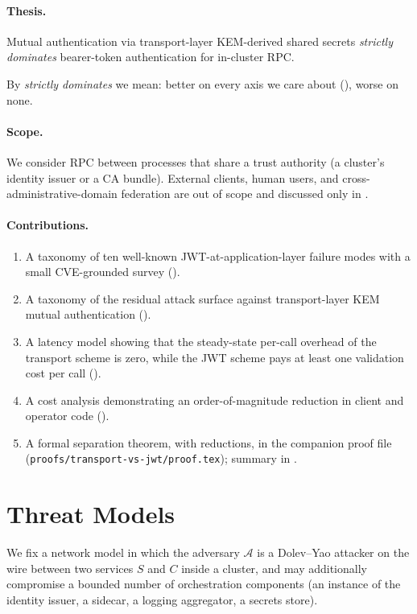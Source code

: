 \documentclass[11pt,a4paper]{article}
\theoremstyle{plain}
\theoremstyle{definition}
\begin{document}
\paragraph{Thesis.}
Mutual authentication via transport-layer KEM-derived shared secrets
\emph{strictly dominates} bearer-token authentication for in-cluster RPC.

By \emph{strictly dominates} we mean: better on every axis we care about
(), worse on none.

\paragraph{Scope.} We consider RPC between processes that share a trust
authority (a cluster's identity issuer or a CA bundle). External clients,
human users, and cross-administrative-domain federation are out of scope and
discussed only in .

\paragraph{Contributions.}
\begin{enumerate}[itemsep=2pt,topsep=2pt]
  \item A taxonomy of ten well-known JWT-at-application-layer failure modes
        with a small CVE-grounded survey ().
  \item A taxonomy of the residual attack surface against transport-layer
        KEM mutual authentication ().
  \item A latency model showing that the steady-state per-call overhead of
        the transport scheme is zero, while the JWT scheme pays at least one
        validation cost per call ().
  \item A cost analysis demonstrating an order-of-magnitude reduction in
        client and operator code ().
  \item A formal separation theorem, with reductions, in the companion
        proof file (\texttt{proofs/transport-vs-jwt/proof.tex}); summary
        in .
\end{enumerate}

\section{Threat Models}
\label{sec:threat}

We fix a network model in which the adversary $\mathcal{A}$ is a Dolev--Yao
attacker on the wire between two services $S$ and $C$ inside a cluster, and
may additionally compromise a bounded number of orchestration components
(an instance of the identity issuer, a sidecar, a logging aggregator, a
secrets store).
\end{document}
